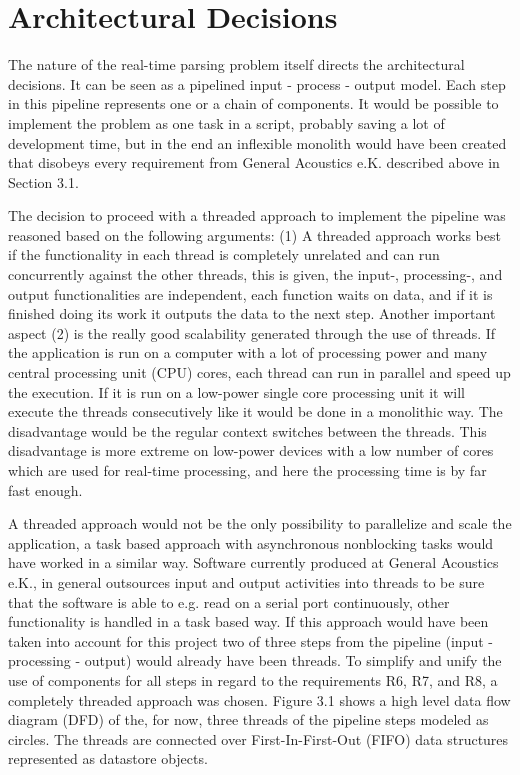 \section{Architectural Decisions}
The nature of the real-time parsing problem itself directs the architectural decisions. It can be seen as a pipelined input - process - output model. Each step in this pipeline represents one or a chain of components. It would be possible to implement the problem as one task in a script, probably saving a lot of development time, but in the end an inflexible monolith would have been created that disobeys every requirement from General Acoustics e.K. described above in Section 3.1.

The decision to proceed with a threaded approach to implement the pipeline was reasoned based on the following arguments: (1) A threaded approach works best if the functionality in each thread is completely unrelated and can run concurrently against the other threads, this is given, the input-, processing-, and output functionalities are independent, each function waits on data, and if it is finished doing its work it outputs the data to the next step. Another important aspect (2) is the really good scalability generated through the use of threads. If the application is run on a computer with a lot of processing power and many central processing unit (CPU) cores, each thread can run in parallel and speed up the execution. If it is run on a low-power single core processing unit it will execute the threads consecutively like it would be done in a monolithic way. The disadvantage would be the regular context switches between the threads. This disadvantage is more extreme on low-power devices with a low number of cores which are used for real-time processing, and here the processing time is by far fast enough.

A threaded approach would not be the only possibility to parallelize and scale the application, a task based approach with asynchronous nonblocking tasks would have worked in a similar way. Software currently produced at General Acoustics e.K., in general outsources input and output activities into threads to be sure that the software is able to e.g. read on a serial port continuously, other functionality is handled in a task based way. If this approach would have been taken into account for this project two of three steps from the pipeline (input - processing - output) would already have been threads. To simplify and unify the use of components for all steps in regard to the requirements R6, R7, and R8, a completely threaded approach was chosen. Figure 3.1 shows a high level data flow diagram (DFD) of the, for now, three threads of the pipeline steps modeled as circles. The threads are connected over First-In-First-Out (FIFO) data structures represented as datastore objects. 

